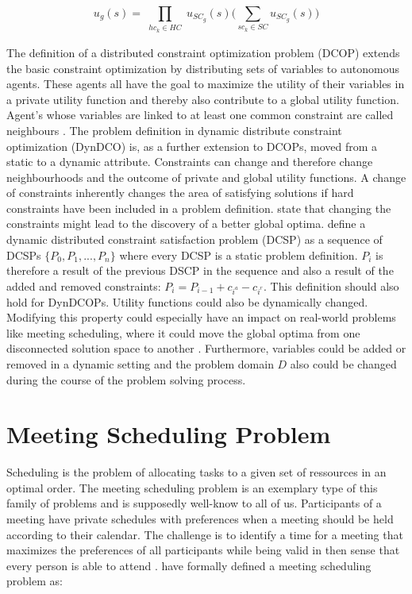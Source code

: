 \[ u_{g}(s) = \prod_{\substack{hc_{k} \in HC}} u_{SC_{g}}(s) \bigg( \sum_{sc_{k} \in SC} u_{SC_{g}}(s) \bigg)\] 


The definition of a distributed constraint optimization problem (DCOP) extends the basic constraint optimization by distributing sets of variables to autonomous agents. These agents all have the goal to maximize the utility of their variables in a private utility function and thereby also contribute to a global utility function. Agent's whose variables are linked to at least one common constraint are called neighbours \cite{Chapman2011, Farinelli, Petcu2003}.
\newline\newline 
The problem definition in dynamic distribute constraint optimization (DynDCO) is, as a further extension to DCOPs, moved from a static to a dynamic attribute. Constraints can change and  therefore change neighbourhoods and the outcome of private and global utility functions. A change of constraints inherently changes the area of satisfying solutions if hard constraints have been included in a problem definition. \cite{Nguyen2012} state that changing the constraints might lead to the discovery of a better global optima. \cite{Maillera} define a dynamic distributed constraint satisfaction problem (DCSP) as a sequence of DCSPs \(\{P_{0}, P_{1}, ..., P_{n}\}\) where every DCSP is a static problem definition. \(P_{i}\) is therefore a result of the previous DSCP in the sequence and also a result of the added and removed constraints: \(P_{i} = P_{i-1} + c_{i^{a}} - c_{i^{r}}\). This definition should also hold for DynDCOPs. Utility functions could also be dynamically changed. Modifying this property could especially have an impact on real-world problems like meeting scheduling, where it could move the global optima from one disconnected solution space to another \cite{Nguyen2012}. Furthermore, variables could be added or removed in a dynamic setting and the problem domain \(D\) also could be changed during the course of the problem solving process.

\section{Meeting Scheduling Problem}  

Scheduling is the problem of allocating tasks to a given set of ressources in an optimal order. The meeting scheduling problem is an exemplary type of this family of problems and is supposedly well-know to all of us. Participants of a meeting have private schedules with preferences when a meeting should be held according to their calendar. The challenge is to identify a time for a meeting that maximizes the preferences of all participants while being valid in then sense that every person is able to attend \cite{Farinelli}. \cite{Scheduling} have formally defined a meeting scheduling problem as:

